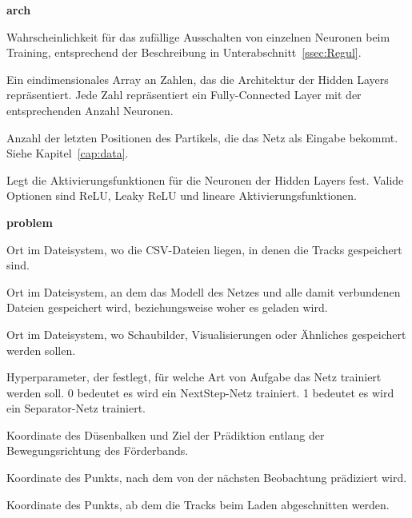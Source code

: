 
\newpage
{\Large \sffamily \textbf{arch}}
\begin{description}[leftmargin=!,labelwidth=\widthof{\bfseries separatorPosition}, labelindent=0.5cm]
    \item [dropoutRate] Wahrscheinlichkeit für das zufällige Ausschalten von einzelnen Neuronen beim Training, entsprechend der Beschreibung in Unterabschnitt~\ref{ssec:Regul}.
    \item [hiddenLayers] Ein ein­di­men­si­o­nales Array an Zahlen, das die Architektur der Hidden Layers repräsentiert. Jede Zahl repräsentiert ein Fully-Connected Layer mit der entsprechenden Anzahl Neuronen.
    \item [featureSize] Anzahl der letzten Positionen des Partikels, die das Netz als Eingabe bekommt. Siehe Kapitel~\ref{cap:data}.
    \item [activation] Legt die Aktivierungsfunktionen für die Neuronen der Hidden Layers fest. Valide Optionen sind ReLU, Leaky ReLU und lineare Aktivierungsfunktionen.
\end{description}

\bigskip
{\Large \sffamily \textbf{problem}}

\begin{description}[leftmargin=!,labelwidth=\widthof{\bfseries separatorPosition}, labelindent=0.5cm]
    \item[dataPath] Ort im Dateisystem, wo die CSV-Dateien liegen, in denen die Tracks gespeichert sind.
    \item[modelBasePath] Ort im Dateisystem, an dem das Modell des Netzes und alle damit verbundenen Dateien gespeichert wird, beziehungsweise woher es geladen wird. 
    \item [imagePath] Ort im Dateisystem, wo Schaubilder, Visualisierungen oder Ähnliches gespeichert werden sollen.
    \item [separator] Hyperparameter, der festlegt, für welche Art von Aufgabe das Netz trainiert werden soll. 0 bedeutet es wird ein NextStep-Netz trainiert. 1 bedeutet es wird ein Separator-Netz trainiert.
\end{description}

\begin{description}[leftmargin=!,labelwidth=\widthof{\bfseries separatorPosition}, labelindent=0.5cm]
    \item[separatorPosition] Koordinate des Düsenbalken und Ziel der Prädiktion entlang der Bewegungsrichtung des Förderbands.
    \item[thresholdPoint] Koordinate des Punkts, nach dem von der nächsten Beobachtung prädiziert wird.
    \item[predictionCutOff] Koordinate des Punkts, ab dem die Tracks beim Laden abgeschnitten werden.
\end{description}

